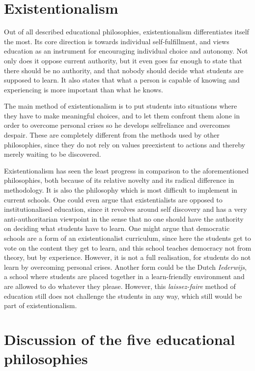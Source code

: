 \section{Existentionalism}

Out of all described educational philosophies, existentionalism differentiates itself the most. Its core direction is towards individual self-fulfillment, and views education as an instrument for encouraging individual choice and autonomy. Not only does it oppose current authority, but it even goes far enough to state that there should be no authority, and that nobody should decide what students are supposed to learn. It also states that what a person is capable of knowing and experiencing is more important than what he knows.

The main method of existentionalism is to put students into situations where they have to make meaningful choices, and to let them confront them alone in order to overcome personal crises so he develops selfreliance and overcomes despair. These are completely different from the methods used by other philosophies, since they do not rely on values preexistent to actions and thereby merely waiting to be discovered.

Existentionalism has seen the least progress in comparison to the aforementioned philosophies, both because of its relative novelty and its radical difference in methodology. It is also the philosophy which is most difficult to implement in current schools. One could even argue that existentialists are opposed to institutionalised education, since it revolves around self discovery and has a very anti-authoritarian viewpoint in the sense that no one should have the authority on deciding what students have to learn. One might argue that democratic schools are a form of an existentionalist curriculum, since here the students get to vote on the content they get to learn, and this school teaches democracy not from theory, but by experience. However, it is not a full realisation, for students do not learn by overcoming personal crises. Another form could be the Dutch \emph{Iederwijs}, a school where students are placed together in a learn-friendly environment and are allowed to do whatever they please. However, this \emph{laissez-faire} method of education still does not challenge the students in any way, which still would be part of existentionalism.

\section{Discussion of the five educational philosophies}


